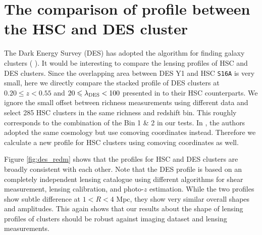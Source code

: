 \documentclass[fleqn,usenatbib,useAMS]{mnras}
\begin{document}
\section{The comparison of \texorpdfstring{\dsigma{}}{DSigma} profile between the HSC and DES \texorpdfstring{\redm{}}{redMaPPer} cluster}
	\label{app:des_redm}
	
	The Dark Energy Survey (DES) has adopted the \redm{} algorithm for finding galaxy clusters
	(\eg{} \citealt{Rykoff2016}).
	It would be interesting to compare the lensing profiles of HSC and DES \redm{} clusters.
	Since the overlapping area between DES Y1 and HSC \texttt{S16A} is very small, here we 
	directly compare the stacked \dsigma{} profile of DES \redm{} clusters at $0.20 \leq z < 0.55$
	and $20 \leq \lambda_{\rm DES} < 100$ presented in \citet{Chang2018} to their HSC counterparts.
	We ignore the small offset between richness measurements using different data and select
	285 HSC \redm{} clusters in the same richness and redshift bin.
	This roughly corresponds to the combination of the Bin 1 \& 2 in our \topn{} tests.
	In \citet{Chang2018}, the authors adopted the same cosmology but use comoving coordinates 
	instead. 
	Therefore we calculate a new \dsigma{} profile for HSC clusters using comoving coordinates as
	well. 
	
	Figure \ref{fig:des_redm} shows that the \dsigma{} profiles for HSC and DES \redm{} clusters
	are broadly consistent with each other.
	Note that the DES \dsigma{} profile is based on an completely independent lensing catalogue 
	using different algorithms for shear measurement, lensing calibration, and photo-$z$ estimation.
	While the two profiles show subtle difference at $1 < R < 4$ Mpc, they show very similar overall
	shapes and amplitudes.
	This again shows that our results about the shape of lensing profiles of \redm{} clusters 
	should be robust against imaging dataset and lensing measurements.
	
\end{document}
